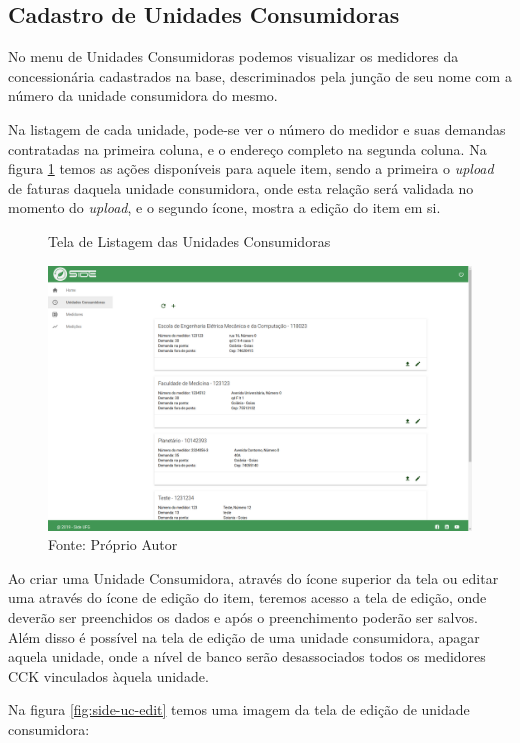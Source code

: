\subsection{Cadastro de Unidades Consumidoras}

No menu de Unidades Consumidoras podemos visualizar os medidores da concessionária cadastrados na base, descriminados pela junção de seu nome com a número da unidade consumidora do mesmo.

Na listagem de cada unidade, pode-se ver o número do medidor e suas demandas contratadas na primeira coluna, e o endereço completo na segunda coluna. Na figura \ref{fig:side-uc-list} temos as ações disponíveis para aquele item, sendo a primeira o \textit{upload} de faturas daquela unidade consumidora, onde esta relação será validada no momento do \textit{upload}, e o segundo ícone, mostra a edição do item em si.

\begin{figure}[H]
    \centering
    \caption{Tela de Listagem das Unidades Consumidoras}
\includegraphics[width=\linewidth]{imagens/side/side-uc-list.png}
    \caption*{Fonte: Próprio Autor}
    \label{fig:side-uc-list}
\end{figure}

Ao criar uma Unidade Consumidora, através do ícone superior da tela ou editar uma através do ícone de edição do item, teremos acesso a tela de edição, onde deverão ser preenchidos os dados e após o preenchimento poderão ser salvos. Além disso é possível na tela de edição de uma unidade consumidora, apagar aquela unidade, onde a nível de banco serão desassociados todos os medidores CCK vinculados àquela unidade. 

\newpage

Na figura \ref{fig:side-uc-edit} temos uma imagem da tela de edição de unidade consumidora:

